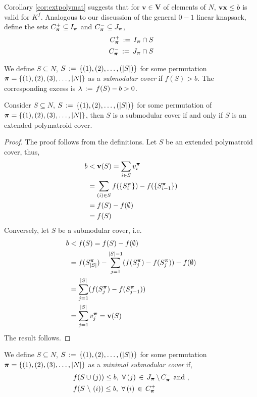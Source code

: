 \documentclass[10pt,twoside]{amsart}
\begin{document}
Corollary \ref{cor:extpolymat} suggests that for $\mathbf{v} \in \mathbf{V}$ of elements of $N$, $\mathbf{v} \mathbf{x} \leq b$ is valid for $K^f$. Analogous to our discussion of the general $0-1$ linear knapsack, define the sets $C^+_{\boldsymbol\pi} \subseteq I_{\boldsymbol\pi}$ and $C^-_{\boldsymbol\pi} \subseteq J_{\boldsymbol\pi}$,
\begin{align*}
  C^+_{\boldsymbol\pi} \,:=\, I_{\boldsymbol\pi} \cap S\\
  C^-_{\boldsymbol\pi} \,:=\, J_{\boldsymbol\pi} \cap S
\end{align*}
\begin{dfn}
  We define $S\subseteq N$, $S \,:=\, \{(1), (2), \ldots, (|S|)\}$ for some permutation $\boldsymbol\pi = \{(1), (2), (3),\ldots, |N|\}$ as a \emph{submodular cover} if $f(S) > b$. The corresponding excess is $\lambda \,:=\, f(S) - b > 0$.
\end{dfn}
\begin{prop}
  Consider $S\subseteq N$, $S \,:=\, \{(1), (2), \ldots, (|S|)\}$ for some permutation of $\boldsymbol\pi = \{(1), (2), (3),\ldots, |N|\}$, then $S$ is a submodular cover if and only if $S$ is an extended polymatroid cover.
\end{prop}
\begin{proof}
  The proof follows from the definitions.
  Let $S$ be an extended polymatroid cover, thus,
  \begin{align*}
    b & < \mathbf{v}(S) = \sum_{i\in S} v^{\boldsymbol\pi}_{i}\\
      & = \sum_{(i)\in S} f(\{S^{\boldsymbol\pi}_i\}) - f(\{S^{\boldsymbol\pi}_{i-1}\})\\
      & = f(S) - f(\emptyset)\\
      & = f(S)
  \end{align*}
  Conversely, let $S$ be a submodular cover, i.e.
  \begin{align*}
    b & < f(S) = f(S) - f(\emptyset)\\
      & = f(S^{\boldsymbol\pi}_{|S|}) - \sum_{j = 1}^{|S|-1}(f(S^{\boldsymbol\pi}_{j}) - f(S^{\boldsymbol\pi}_{j})) - f(\emptyset)\\
      & = \sum_{j = 1}^{|S|}(f(S^{\boldsymbol\pi}_{j}) - f(S^{\boldsymbol\pi}_{j-1}))\\
      & = \sum_{j = 1}^{|S|} v^{\boldsymbol\pi}_j = \mathbf{v}(S)
  \end{align*}
  The result follows.
\end{proof}

\begin{dfn}
  We define $S\subseteq N$, $S \,:=\, \{(1), (2), \ldots, (|S|)\}$ for some permutation $\boldsymbol\pi = \{(1), (2), (3),\ldots, |N|\}$ as a \emph{minimal submodular cover} if, {}
  \begin{align*}
    & f(S\cup (j)) \leq b,\,\,\forall\,(j) \,\in\, J_{\boldsymbol\pi}\,\backslash\, C^-_{\boldsymbol\pi} \text{   and },\\
    & f(S\,\,\backslash\,\, (i)) \leq b,\,\,\forall\,(i) \,\in\, C^+_{\boldsymbol\pi}
  \end{align*}
\end{dfn}
\end{document}
